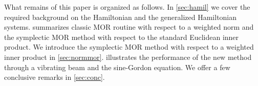 What remains of this paper is organized as follows. In \cref{sec:hamil} we cover the required background on the Hamiltonian and the generalized Hamiltonian systems.  summarizes classic MOR routine with respect to a weighted norm and the symplectic MOR method with respect to the standard Euclidean inner product. We introduce the symplectic MOR method with respect to a weighted inner product in \cref{sec:normmor}.  illustrates the performance of the new method through a vibrating beam and the sine-Gordon equation. We offer a few conclusive remarks in \cref{sec:conc}.
